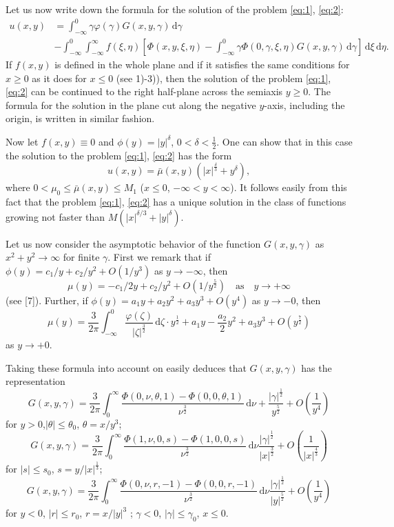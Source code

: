 \documentclass[a4paper,12pt]{article}
\newcommand{\dd}{\,\mathrm{d}}
\begin{document}
Let us now write down the formula for the solution of the problem \eqref{eq:1}, \eqref{eq:2}:
\begin{equation}
	\begin{split}
		u(x, y) & = \int_{-\infty}^{0} \gamma \varphi(\gamma) G(x, y, \gamma) \dd \gamma \\
		& -\int_{-\infty}^{0} \int_{-\infty}^{\infty} f(\xi, \eta)\left[\Phi(x, y, \xi, \eta)-\int_{-\infty}^{0} \gamma \Phi(0, \gamma, \xi, \eta) G(x, y, \gamma) \dd \gamma\right] \dd \xi \dd \eta .
	\end{split}
\end{equation}
If $f(x, y)$ is defined in the whole plane and if it satisfies the same conditions for $x \geq 0$ as it does for $x \leq 0$ (see 1)-3)), then the solution of the problem \eqref{eq:1}, \eqref{eq:2} can be continued to the right half-plane across the semiaxis $y \geq 0$. The formula for the solution in the plane cut along the negative $y$-axis, including the origin, is written in similar fashion.

Now let $f(x, y) \equiv 0$ and $\phi(y)=|y|^{\delta}$, $0<\delta<\frac{1}{2}$. One can show that in this case the solution to the problem \eqref{eq:1}, \eqref{eq:2} has the form
$$
u(x, y)=\bar{\mu}(x, y)\left(|x|^{\frac{\delta}{3}}+y^{\delta}\right),
$$
where $0<\mu_{0} \leq \bar{\mu}(x, y) \leq M_{1}$ ($x \leq 0$, $-\infty<y<\infty$). It follows easily from this fact that the problem \eqref{eq:1}, \eqref{eq:2} has a unique solution in the class of functions growing not faster than $M\left(|x|^{\delta / 3}+|y|^{\delta}\right)$.

Let us now consider the asymptotic behavior of the function $G(x, y, \gamma)$ as $x^{2}+y^2 \to \infty$ for finite $\gamma$. 
First we remark that if $\phi(y)=c_{1} / y+c_{2} / y^{2}+O\left(1 / y^{3}\right)$ as $y \rightarrow-\infty$,
then 
$$\mu(y)=-c_{1} / 2 y+c_{2} / y^{2}+O\left(1 / y^{\frac{5}{2}}\right) \quad \text{as} \quad y \rightarrow+\infty$$
(see [7]). Further, if $\phi(y)=a_{1} y+a_{2} y^{2}+a_{3} y^{3}+O\left(y^{4}\right)$ as $y \rightarrow-0$, then
$$\mu(y)=\frac{3}{2 \pi} \int_{-\infty}^{0} \frac{\varphi(\zeta)}{|\zeta|^{\frac{3}{2}}} \dd \zeta \cdot y^{\frac{1}{2}}+a_{1} y-\frac{a_{2}}{2} y^{2}+a_{3} y^{3}+O\left(y^{\frac{7}{2}}\right)$$
as $y \rightarrow+0$. 

Taking these formula into account on easily deduces that $G(x,y,\gamma)$ has the representation
$$G(x, y, \gamma)=\frac{3}{2 \pi} \int_{0}^{\infty} \frac{\Phi(0, \nu, \theta, 1)-\Phi(0,0, \theta, 1)}{\nu^{\frac{3}{2}}} \dd \nu +\frac{|\gamma|^{\frac{1}{2}}}{y^{\frac{5}{2}}}+O\left(\frac{1}{y^{4}}\right)$$
for $y>0$,$|\theta| \leq \theta_{0}$, $\theta=x / y^{3}$;
$$G(x, y, \gamma)=\frac{3}{2 \pi} \int_{0}^{\infty} \frac{\Phi(1, \nu, 0, s)-\Phi(1,0,0, s)}{\nu^{\frac{3}{2}}} \dd \nu \frac{|\gamma|^{\frac{1}{2}}}{|x|^{\frac{3}{2}}}+O\left(\frac{1}{|x|^{\frac{4}{3}}}\right)$$
for $|s| \leq s_{0}$, $s=y /|x|^{\frac{1}{3}}$;
$$G(x, y, \gamma)=\frac{3}{2 \pi} \int_{0}^{\infty} \frac{\Phi(0, \nu, r,-1)-\Phi(0,0, r,-1)}{\nu^{\frac{3}{2}}} \dd \nu \frac{|\gamma|^{\frac{1}{2}}}{|y|^{\frac{5}{2}}}+O\left(\frac{1}{y^{4}}\right)$$
for $y<0$, $|r| \leq r_{0}$, $r=x /|y|^{3}$ ; $\gamma<0$, $|\gamma| \leq \gamma_{0}$, $x \leq 0$.
\end{document}
